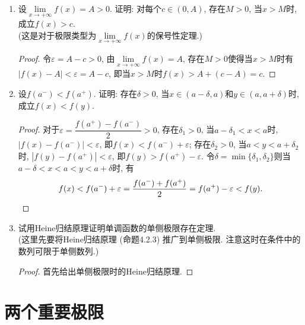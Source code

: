 \documentclass[a4paper,11pt,twoside]{ctexbook}
\begin{document}
\begin{enumerate}
\begin{proof}
		      对于任意给定的$\varepsilon>0$, 由于$\lim\limits_{n\to\infty} f(x_n)=A$, 存在$N\in\mathbf{N}_{+}$使得$|f(x_n)-A|<\varepsilon$, 即当$n>N$时$f(x_n)>A-\varepsilon$. 固定$n>N$, 令$\delta=\dfrac{b-x_n}{2}$, 则当$b-\delta<x<b$时, $x>x_n$, 由于$f$在$(a,b)$上单调增加以$A$为上界, 有
		      \[
			      A-\varepsilon<f(x_n)\leqslant f(x)<A<A+\varepsilon.
		      \]
		      即$\lim\limits_{x\to b}=A$. \qedhere
	      \end{proof}

	\item 设$\lim\limits_{x\to+\infty}f(x)=A>0$. 证明: 对每个$c\in(0,A)$, 存在$M>0$, 当$x>M$时, 成立$f(x)>c$. \\
	      (这是对于极限类型为$\lim\limits_{x\to+\infty} f(x)$的保号性定理.)
	      \begin{proof}
		      令$\varepsilon=A-c>0$, 由$\lim\limits_{x\to+\infty} f(x)=A$, 存在$M>0$使得当$x>M$时有$|f(x)-A|<\varepsilon=A-c$, 即当$x>M$时$f(x)>A+(c-A)=c$. \qedhere
	      \end{proof}

	\item 设$f(a^{-})<f(a^{+})$. 证明: 存在$\delta>0$, 当$x\in(a-\delta,a)$和$y\in(a,a+\delta)$时, 成立$f(x)<f(y)$.
	      \begin{proof}
		      对于$\varepsilon=\dfrac{f(a^{+})-f(a^{-})}{2}>0$, 存在$\delta_1>0$, 当$a-\delta_1<x<a$时, $|f(x)-f(a^{-})|<\varepsilon$, 即$f(x)<f(a^{-})+\varepsilon$; 存在$\delta_2>0$, 当$a<y<a+\delta_2$时, $|f(y)-f(a^{+})|<\varepsilon$, 即$f(y)>f(a^{+})-\varepsilon$. 令$\delta=\min\{\delta_1,\delta_2\}$则当$a-\delta<x<a<y<a+\delta$时, 有
		      \[
			      f(x)<f(a^{-})+\varepsilon=\dfrac{f(a^{-})+f(a^{+})}{2}=f(a^{+})-\varepsilon<f(y). \qedhere
		      \]
	      \end{proof}

	\item 试用Heine归结原理证明单调函数的单侧极限存在定理. \\
	      (这里先要将Heine归结原理 (命题4.2.3) 推广到单侧极限. 注意这时在条件中的数列可限于单侧数列.)
	      \begin{proof}
		      首先给出单侧极限时的Heine归结原理.
	      \end{proof}
\end{enumerate}

\section{两个重要极限}
\end{document}
